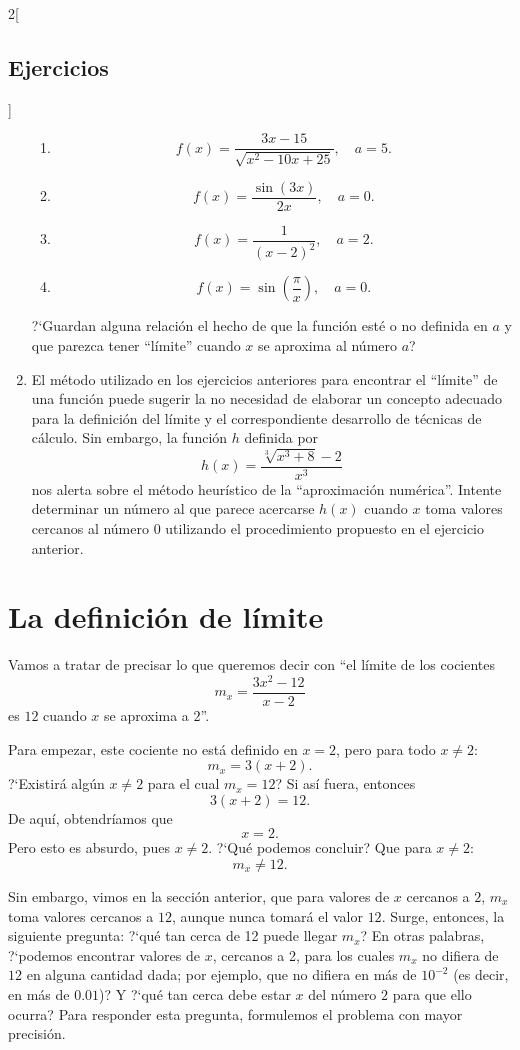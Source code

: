 \begin{multicols}{2}[\subsection{Ejercicios}]
\begin{enumerate}[leftmargin=*]
\begin{enumerate}[leftmargin=*]
    \item
    \[
        f(x) = \frac{3x - 15}{\sqrt{x^2 - 10x + 25}},\quad a = 5.
    \]

    \item
    \[
        f(x) = \frac{\sin(3x)}{2x},\quad a = 0.
    \]

    \item
    \[
        f(x) = \frac{1}{(x - 2)^2},\quad a = 2.
    \]


    \item
    \[
        f(x) = \sin\left(\frac{\pi}{x}\right),\quad a = 0.
    \]

    \end{enumerate}

    ?`Guardan alguna relación el hecho de que la función esté o no definida en $a$ y que parezca
    tener ``límite'' cuando $x$ se aproxima al número $a$?

\item El método utilizado en los ejercicios anteriores para encontrar el ``límite'' de una
    función puede sugerir la no necesidad de elaborar un concepto adecuado para la definición
    del límite y el correspondiente desarrollo de técnicas de cálculo. Sin embargo, la función
    $h$ definida por
    \[
      h(x) = \frac{\sqrt[3]{x^3 + 8} - 2}{x^3}
    \]
    nos alerta sobre el método heurístico de la ``aproximación numérica''. Intente determinar
    un número al que parece acercarse $h(x)$ cuando $x$ toma valores cercanos al número $0$
    utilizando el procedimiento propuesto en el ejercicio anterior.
\end{enumerate}
\endgroup
\end{multicols}

\section{La definición de límite}
Vamos a tratar de precisar lo que queremos decir con ``el límite de los cocientes
\[
m_x = \frac{3x^2 - 12}{x-2}
\]
es $12$ cuando $x$ se aproxima a $2$''.

Para empezar, este cociente no está definido en $x = 2$, pero para todo $x\neq 2$:
\[
m_x = 3(x + 2).
\]
?`Existirá algún $x\neq 2$ para el cual $m_x = 12$? Si así fuera, entonces
\[
3(x + 2) = 12.
\]
De aquí, obtendríamos que
\[
x = 2.
\]
Pero esto es absurdo, pues $x\neq 2$. ?`Qué podemos concluir? Que para $x\neq 2$:
\[
m_x \neq 12.
\]

\label{eqLimBeginPLim}Sin embargo, vimos en la sección anterior, que para valores de $x$ cercanos a
$2$, $m_x$ toma valores cercanos a $12$, aunque nunca tomará el valor $12$. Surge, entonces, la
siguiente pregunta: ?`qué tan cerca de 12 puede llegar $m_x$? En otras palabras, ?`podemos encontrar
valores de $x$, cercanos a 2, para los cuales $m_x$ no difiera de $12$ en alguna cantidad dada; por
ejemplo, que no difiera en más de $10^{-2}$ (es decir, en más de $0.01$)? Y ?`qué tan cerca debe
estar $x$ del número $2$ para que ello ocurra? Para responder esta pregunta, formulemos el problema
con mayor precisión.

